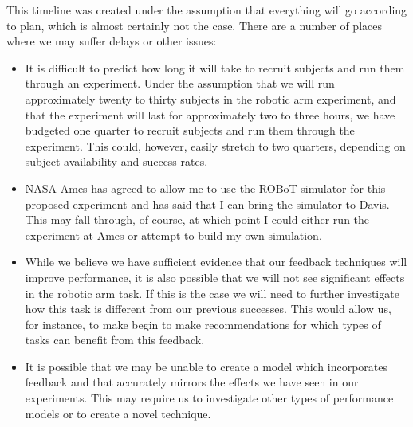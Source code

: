 \documentclass[float=false, crop=false]{standalone}
\begin{document}
This timeline was created under the assumption that everything will go according to plan, which is almost certainly not the case.
There are a number of places where we may suffer delays or other issues:
\begin{itemize}
\item It is difficult to predict how long it will take to recruit subjects and run them through an experiment.
Under the assumption that we will run approximately twenty to thirty subjects in the robotic arm experiment, and that the experiment will last for approximately two to three hours, we have budgeted one quarter to recruit subjects and run them through the experiment.
This could, however, easily stretch to two quarters, depending on subject availability and success rates.
\item NASA Ames has agreed to allow me to use the ROBoT simulator for this proposed experiment and has said that I can bring the simulator to Davis.
This may fall through, of course, at which point I could either run the experiment at Ames or attempt to build my own simulation.
\item While we believe we have sufficient evidence that our feedback techniques will improve performance, it is also possible that we will not see significant effects in the robotic arm task.
If this is the case we will need to further investigate how this task is different from our previous successes.
This would allow us, for instance, to make begin to make recommendations for which types of tasks can benefit from this feedback.
\item It is possible that we may be unable to create a model which incorporates feedback and that accurately mirrors the effects we have seen in our experiments. This may require us to investigate other types of performance models or to create a novel technique.
\end{itemize}
\end{document}
